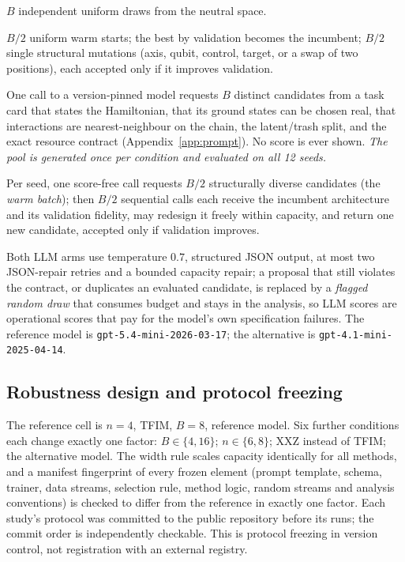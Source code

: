\documentclass[11pt]{article}
\begin{document}
\begin{description}[leftmargin=0pt,itemsep=2pt]
\item[Random.] $B$ independent uniform draws from the neutral space.
\item[Greedy.] $B/2$ uniform warm starts; the best by validation becomes the
incumbent; $B/2$ single structural mutations (axis, qubit, control, target, or a swap
of two positions), each accepted only if it improves validation.
\item[LLM-Open.] One call to a version-pinned model requests $B$ distinct candidates
from a task card that states the Hamiltonian, that its ground states can be chosen
real, that interactions are nearest-neighbour on the chain, the latent/trash split, and
the exact resource contract (Appendix~\ref{app:prompt}). No score is ever shown.
\emph{The pool is generated once per condition and evaluated on all 12 seeds.}
\item[LLM-Closed.] Per seed, one score-free call requests $B/2$ structurally diverse
candidates (the \emph{warm batch}); then $B/2$ sequential calls each receive the
incumbent architecture and its validation fidelity, may redesign it freely within
capacity, and return one new candidate, accepted only if validation improves.
\end{description}
Both LLM arms use temperature $0.7$, structured JSON output, at most two JSON-repair
retries and a bounded capacity repair; a proposal that still violates the contract,
or duplicates an evaluated candidate, is replaced by a \emph{flagged random draw}
that consumes budget and stays in the analysis, so LLM scores are operational scores
that pay for the model's own specification failures.
The reference model is \texttt{gpt-5.4-mini-2026-03-17}; the alternative is
\texttt{gpt-4.1-mini-2025-04-14}.

\subsection{Robustness design and protocol freezing}
\label{sec:design}

The reference cell is $n=4$, TFIM, $B=8$, reference model. Six further conditions each
change exactly one factor: $B\in\{4,16\}$; $n\in\{6,8\}$; XXZ instead of TFIM; the
alternative model. The width rule scales capacity identically for all methods, and a
manifest fingerprint of every frozen element (prompt template, schema, trainer, data
streams, selection rule, method logic, random streams and analysis conventions) is
checked to differ from the reference in exactly one factor.
Each study's protocol was committed to the public repository before its runs; the
commit order is independently checkable. This is protocol freezing in version control,
not registration with an external registry.
\end{document}
